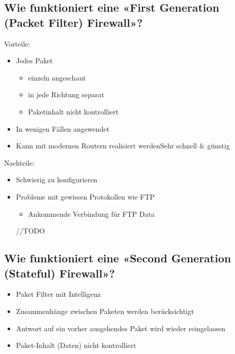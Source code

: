 \subsection*{Wie funktioniert eine «First Generation (Packet Filter) Firewall»?}
Vorteile:
\begin{itemize}
    \item Jedes Paket
    \begin{itemize}
        \item einzeln angeschaut
        \item in jede Richtung separat
        \item Paketinhalt nicht kontrolliert
    \end{itemize}
    \item In wenigen Fällen angewendet
    \item Kann mit modernen Routern realisiert werdenSehr schnell \& günstig
\end{itemize}
Nachteile:
\begin{itemize}
    \item Schwierig zu konfigurieren
    \item Probleme mit gewissen Protokollen wie FTP
    \begin{itemize}
        \item Ankommende Verbindung für FTP Data
    \end{itemize}
    //TODO
\end{itemize}

\subsection*{Wie funktioniert eine «Second Generation (Stateful) Firewall»?}
\begin{itemize}
    \item Paket Filter mit Intelligenz
    \item Zusammenhänge zwischen Paketen werden berücksichtigt
    \item Antwort auf ein vorher ausgehendes Paket wird wieder reingelassen
    \item Paket-Inhalt (Daten) nicht kontrolliert
\end{itemize}

